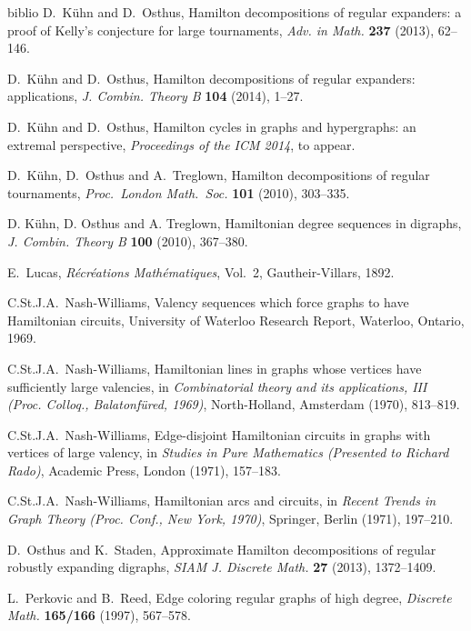 \begin{thebibliography}{biblio}
 D.~K\"uhn and D.~Osthus, Hamilton decompositions of regular expanders: a proof of Kelly's conjecture for large tournaments,
\emph{Adv. in Math.} {\bf 237} (2013), 62--146.

 D.~K\"uhn and D.~Osthus,
Hamilton decompositions of regular expanders: applications, \emph{J. Combin. Theory B} {\bf 104} (2014), 1--27.

 D.~K\"uhn and D.~Osthus, Hamilton cycles in graphs and hypergraphs: an extremal perspective, \emph{Proceedings of the ICM 2014}, to appear.



 D.~K\"uhn, D.~Osthus and A.~Treglown,
Hamilton decompositions of regular tournaments, 
\emph{Proc.~London Math.~Soc.} {\bf 101} (2010), 303--335.

 D. K\"{u}hn, D. Osthus and A. Treglown, Hamiltonian degree sequences in digraphs, \emph{J. Combin. Theory B} {\bf 100}
(2010), 367--380.

 E.~Lucas, \emph{R\'ecr\'eations Math\'ematiques}, Vol.~2, Gautheir-Villars, 1892.


 C.St.J.A.~Nash-Williams, 
Valency sequences which force graphs to have Hamiltonian circuits,
University of Waterloo Research Report, Waterloo, Ontario, 1969.

 C.St.J.A.~Nash-Williams, Hamiltonian lines
in graphs whose vertices have sufficiently large valencies, in \emph{Combinatorial
theory and its applications, III (Proc. Colloq., Balatonf\"ured, 1969)},
North-Holland, Amsterdam (1970), 813--819.

 C.St.J.A.~Nash-Williams, Edge-disjoint
Hamiltonian circuits in graphs with vertices of large valency, in
\emph{Studies in Pure Mathematics (Presented to Richard Rado)}, Academic
Press, London (1971), 157--183.


 C.St.J.A.~Nash-Williams, Hamiltonian
arcs and circuits, in \emph{Recent Trends in Graph Theory (Proc. Conf.,
New York, 1970)}, Springer, Berlin (1971), 197--210.

 D.~Osthus and K.~Staden,
Approximate Hamilton decompositions of regular robustly expanding digraphs, 
\emph{SIAM J. Discrete Math.} {\bf 27} (2013), 1372--1409.


 L.~Perkovic and B.~Reed, 
Edge coloring regular graphs of high degree, \emph{Discrete Math.} {\bf 165/166} (1997), 567--578.



\end{thebibliography}

